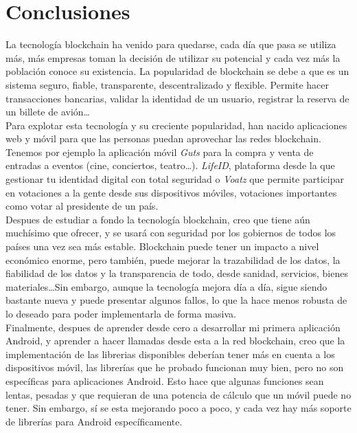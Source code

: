 \chapter{Conclusiones}
\label{cap:Conclusiones}

La tecnología blockchain ha venido para quedarse, cada día que pasa se utiliza más, más empresas toman la decisión de utilizar su potencial y cada vez más la población conoce su existencia. La popularidad de blockchain se debe a que es un sistema seguro, fiable, transparente, descentralizado y flexible. Permite hacer transacciones bancarias, validar la identidad de un usuario, registrar la reserva de un billete de avión\dots \\

Para explotar esta tecnología y su creciente popularidad, han nacido aplicaciones web y móvil para que las personas puedan aprovechar las redes blockchain. Tenemos por ejemplo la aplicación móvil \emph{Guts} para la compra y venta de entradas a eventos (cine, conciertos, teatro\dots). \emph{LifeID}, plataforma desde la que gestionar tu identidad digital con total seguridad o \emph{Voatz} que permite participar en votaciones a la gente desde sus dispositivos móviles, votaciones importantes como votar al presidente de un país. \\

Despues de estudiar a fondo la tecnología blockchain, creo que tiene aún muchísimo que ofrecer, y se usará con seguridad por los gobiernos de todos los países una vez sea más estable. Blockchain puede tener un impacto a nivel económico enorme, pero también, puede mejorar la trazabilidad de los datos, la fiabilidad de los datos y la transparencia de todo, desde sanidad, servicios, bienes materiales\dots Sin embargo, aunque la tecnología mejora día a día, sigue siendo bastante nueva y puede presentar algunos fallos, lo que la hace menos robusta de lo deseado para poder implementarla de forma masiva. \\

Finalmente, despues de aprender desde cero a desarrollar mi primera aplicación Android, y aprender a hacer llamadas desde esta a la red blockchain, creo que la implementación de las librerias disponibles deberían tener más en cuenta a los dispositivos móvil, las librerías que he probado funcionan muy bien, pero no son específicas para aplicaciones Android. Esto hace que algunas funciones sean lentas, pesadas y que requieran de una potencia de cálculo que un móvil puede no tener. Sin embargo, sí se esta mejorando poco a poco, y cada vez hay más soporte de librerías para Android específicamente. \\

